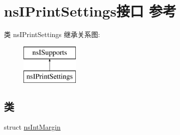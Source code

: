 \hypertarget{interfacens_i_print_settings}{}\section{ns\+I\+Print\+Settings接口 参考}
\label{interfacens_i_print_settings}
类 ns\+I\+Print\+Settings 继承关系图\+:\begin{figure}[H]
\begin{center}
\leavevmode
\includegraphics[height=2.000000cm]{interfacens_i_print_settings}
\end{center}
\end{figure}
\subsection*{类}
\begin{DoxyCompactItemize}
\item 
struct \hyperlink{structns_i_print_settings_1_1ns_int_margin}{ns\+Int\+Margin}
\end{DoxyCompactItemize}
